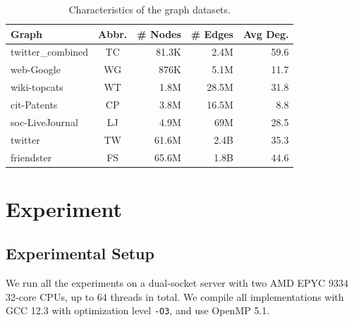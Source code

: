 




\begin{table}[t]
    \centering
    \caption{Characteristics of the graph datasets.}
    \setlength{\tabcolsep}{8.8pt}
    \begin{tabular}{l c r r r}
        \toprule
        \textbf{Graph}
        & \textbf{Abbr.}
        & \textbf{\# Nodes}
        & \textbf{\# Edges}
        & \textbf{Avg Deg.} \\
        \midrule
        twitter\_combined  & TC  & 81.3K       & 2.4M           & 59.6  \\
        web-Google         & WG  & 876K        & 5.1M           & 11.7  \\
        wiki-topcats       & WT  & 1.8M        & 28.5M          & 31.8  \\
        cit-Patents        & CP  & 3.8M        & 16.5M          & 8.8   \\
        soc-LiveJournal   & LJ  & 4.9M        & 69M            & 28.5  \\
        twitter            & TW  & 61.6M       & 2.4B           & 35.3  \\
        friendster         & FS  & 65.6M       & 1.8B           & 44.6  \\
        \bottomrule
    \end{tabular}
    \label{tab:dataset_characteristics}
 
\end{table}


\section{Experiment}
\subsection{Experimental Setup}

We run all the experiments on a dual-socket server with two AMD EPYC 9334 32-core CPUs, up to 64 threads in total.
We compile all implementations with GCC 12.3 with optimization level \texttt{-O3}, and use OpenMP 5.1.


